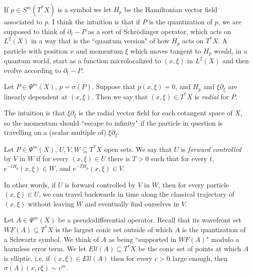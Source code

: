 \documentclass[12pt]{article}
\begin{document}
If $p \in S^m(T^*X)$ is a symbol we let $H_p$ be the Hamiltonian vector field associated to $p$.
I think the intuition is that if $P$ is the quantization of $p$, we are supposed to think of $\partial_t - P$ as a sort of Schr\"odinger operator, which acts on $L^2(X)$ in a way that is the ``quantum version" of how $H_p$ acts on $T^*X$.
A particle with position $x$ and momentum $\xi$ which moves tangent to $H_p$ would, in a quantum world, start as a function microlocalized to $(x, \xi)$ in $L^2(X)$ and then evolve according to $\partial_t - P$.

\begin{definition}
Let $P \in \Psi^m(X)$, $p = \sigma(P)$.
Suppose that $p(x, \xi) = 0$, and $H_p$ and $\xi \partial_\xi$ are linearly dependent at $(x, \xi)$.
Then we say that $(x, \xi) \in T^*X$ is \emph{radial} for $P$.
\end{definition}

The intuition is that $\xi \partial_\xi$ is the radial vector field for each cotangent space of $X$, so the momentum should ``escape to infinity" if the particle in question is travelling on a (scalar multiple of) $\xi \partial_\xi$.

\begin{definition}
Let $P \in \Psi^m(X)$, $U, V, W \subseteq T^*X$ open sets.
We say that $U$ is \emph{forward controlled} by $V$ in $W$ if for every $(x, \xi) \in U$ there is $T > 0$ such that for every $t$, $e^{-tH_p}(x, \xi) \in W$, and $e^{-TH_p}(x, \xi) \in V$.
\end{definition}

In other words, if $U$ is forward controlled by $V$ in $W$, then for every particle $(x, \xi) \in U$, we can travel backwards in time along the classical trajectory of $(x, \xi)$ without leaving $W$ and eventually find ourselves in $V$.

Let $A \in \Psi^m(X)$ be a pseudodifferential operator.
Recall that its wavefront set $WF(A) \subseteq T^*X$ is the largest conic set outside of which $A$ is the quantization of a Schwartz symbol.
We think of $A$ as being ``supported in $WF(A)$" modulo a harmless error term.
We let $Ell(A) \subseteq T^*X$ be the conic set of points at which $A$ is elliptic, i.e. if $(x, \xi) \in Ell(A)$ then for every $c > 0$ large enough, then $\sigma(A)(x, c\xi) \sim c^m$.
\end{document}
